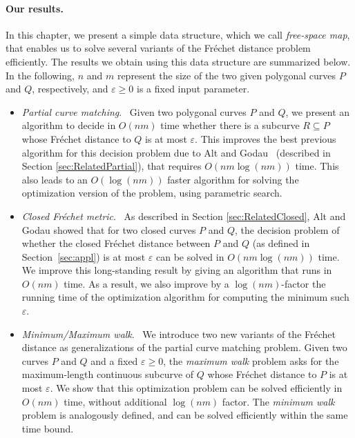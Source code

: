 \documentclass[12pt]{dalthesis}
\newcommand{\gee}{\geqslant}
\newcommand{\eps}{\varepsilon}
\newcommand{\Frechet}{Fr\'echet }
\newcommand{\fs}{free-space }
\begin{document}
\paragraph{\bf Our results.\ }
In this chapter, we present a simple data structure, which we call \emph{\fs map},
that enables us to solve several variants of the \Frechet distance problem efficiently.
The results we obtain using this data structure are summarized below.
In the following, $n$ and $m$ represent the size of 
the two given polygonal curves $P$ and $Q$, respectively, 
and $\eps \gee 0$ is a fixed input parameter.

\begin{itemize}\setlength{\itemsep}{.3em}
\renewcommand{\labelitemi}{${\tiny \bullet}$}

	\item \emph{Partial curve matching}. \ 
	Given two polygonal curves $P$ and $Q$, 
	we present an algorithm to decide in $O(nm)$ time whether
	there is a subcurve $R \subseteq P$ whose \Frechet distance to $Q$ is at most $\eps$.
	This improves the best previous algorithm for this decision problem 
	due to Alt and Godau~\cite{AltG95}
	(described in Section \ref{sec:RelatedPartial}),
	that requires $O(nm \log (nm))$ time.
	This also leads to an $O(\log (nm))$ faster algorithm for solving
	the optimization version of the problem, using parametric search.
	
	\item \emph{Closed \Frechet metric}. \ 
	As described in Section \ref{sec:RelatedClosed},	
	Alt and Godau showed that 
	for two closed curves $P$ and $Q$, 	
	the decision problem of whether the closed \Frechet distance between $P$
	and $Q$ (as defined in Section~\ref{sec:appl})
	is at most $\eps$ can be solved in $O(nm \log (nm))$ time. 
	We improve this long-standing result by giving an algorithm that runs in $O(nm)$ time.
	As a result, we also improve by a $\log (nm)$-factor 
	the running time of the optimization algorithm for computing the minimum such $\eps$.

	\item \emph{Minimum/Maximum walk}. \ 
	We introduce two new variants of the \Frechet distance
	as generalizations of the partial curve matching problem.
	Given two curves $P$ and $Q$ and a fixed $\eps \gee 0$, 
	the \emph{maximum walk} problem asks for the
	maximum-length continuous subcurve of $Q$ whose \Frechet distance to $P$ is at most $\eps$.
	We show that this optimization problem can be solved efficiently in $O(nm)$ time,
	without additional $\log (nm)$ factor.
	The \emph{minimum walk} problem is analogously defined, and can be solved efficiently
	within the same time bound.


\end{itemize}
\end{document}
